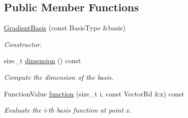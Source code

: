 \subsection*{Public Member Functions}
\begin{DoxyCompactItemize}
\item 
\mbox{\label{classHArDCore2D_1_1GradientBasis_a4177dd42cb8ac5499f6eae33965c0e69}} 
\hyperlink{classHArDCore2D_1_1GradientBasis_a4177dd42cb8ac5499f6eae33965c0e69}{Gradient\+Basis} (const Basis\+Type \&basis)
\begin{DoxyCompactList}\small\item\em Constructor. \end{DoxyCompactList}\item 
\mbox{\label{classHArDCore2D_1_1GradientBasis_a013a7a8c18e05623b1c9f6562f80c9e6}} 
size\+\_\+t \hyperlink{classHArDCore2D_1_1GradientBasis_a013a7a8c18e05623b1c9f6562f80c9e6}{dimension} () const
\begin{DoxyCompactList}\small\item\em Compute the dimension of the basis. \end{DoxyCompactList}\item 
\mbox{\label{classHArDCore2D_1_1GradientBasis_a5e054975f7e1247ba66f08fa159dcf84}} 
Function\+Value \hyperlink{classHArDCore2D_1_1GradientBasis_a5e054975f7e1247ba66f08fa159dcf84}{function} (size\+\_\+t i, const Vector\+Rd \&x) const
\begin{DoxyCompactList}\small\item\em Evaluate the i-\/th basis function at point x. \end{DoxyCompactList}\end{DoxyCompactItemize}
